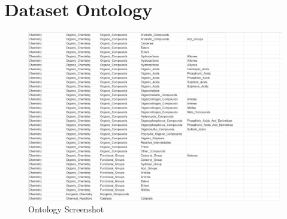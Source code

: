 \documentclass[11pt]{article}
\begin{document}



\appendix



 \section{Dataset Ontology}

\label{sec:appendix1}


\begin{figure}[ht]
	\begin{center}
		\centerline{\includegraphics[width=2 
			\columnwidth]{ont.jpg}}
		\caption{Ontology Screenshot}
		\label{fig:ont}
	\end{center}
\end{figure}
\end{document}
